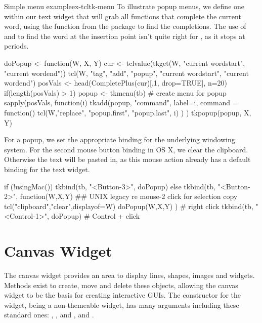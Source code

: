 \begin{example}{Simple menu example}{ex-tcltk-menu}
To illustrate popup menus, we define one within our text widget that will grab all
functions that complete the current word, using the
 function from the  package to find
the completions.  The use of  and
 to find the word at the insertion point isn't quite
right for \R, as it stops at periods.
\begin{Schunk}
\begin{Sinput}
 doPopup <- function(W, X, Y) {
   cur <- tclvalue(tkget(W, "current  wordstart", 
                            "current wordend"))
   tcl(W, "tag", "add", "popup", "current  wordstart", 
                                 "current wordend")
   posVals <- head(CompletePlus(cur)[,1, drop=TRUE], n=20)
   if(length(posVals) > 1) {
     popup <- tkmenu(tb)                # create menu for popup
     sapply(posVals, function(i) {         
       tkadd(popup, "command", label=i, command = function() {
         tcl(W,"replace", "popup.first", "popup.last", i)
       })
     })
     tkpopup(popup, X, Y)
  }}
\end{Sinput}
\end{Schunk}

For a popup, we set the appropriate binding for the underlying
windowing system. For the second mouse button binding in OS X, we
clear the clipboard. Otherwise the text  will be pasted in, as this mouse
action already has a default binding for the text widget.

\begin{Schunk}
\begin{Sinput}
 if (!usingMac()) {
   tkbind(tb, "<Button-3>", doPopup)
 } else {
   tkbind(tb, "<Button-2>", function(W,X,Y) {
     ## UNIX legacy re mouse-2 click for selection copy
     tcl("clipboard","clear",displayof=W) 
     doPopup(W,X,Y)
     })      # right click
   tkbind(tb, "<Control-1>", doPopup)     # Control + click
 }
\end{Sinput}
\end{Schunk}
\end{example}

\section{Canvas Widget}
\label{sec:tcltk:canvas-widget}

 
The canvas widget provides an area to display lines, shapes, images
and widgets. Methods exist to create, move and delete these objects,
allowing the canvas widget to be the basis for creating interactive
GUIs. The constructor  for the widget, being a
non-themeable widget, has many arguments including these standard ones:
, , and
, 
and .



